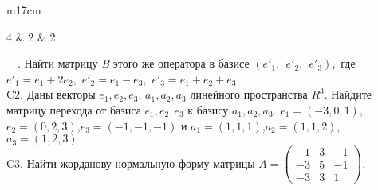 \documentclass{article}
\begin{document}
\begin{tabular}{m{17cm}}
\begin{bmatrix}
4 & 2 & 2
\end{bmatrix}\ \ .\) Найти матрицу \emph{B} этого же оператора в базисе \(({e'}_{1},\ \ {e'}_{2},\ \ {e'}_{3}),\) где \({e'}_{1} = e_{1} + 2e_{2},\) \({e'}_{2} = e_{1} - e_{3},\) \({e'}_{3} = e_{1} + e_{2} + e_{3}.\) \\
C2. Даны векторы \(e_{1},e_{2},e_{3}\), \(a_{1},a_{2},a_{3}\) линейного пространства \(R^{3}\). Найдите матрицу перехода от базиса \(e_{1},e_{2},e_{3}\) к базису \(a_{1},a_{2},a_{3}\).
\(e_{1} = ( - 3,0,1)\),\(e_{2} = (0,2,3)\),\(e_{3} = ( - 1, - 1, - 1)\) и \(a_{1} = (1,1,1)\),\(a_{2} = (1,1,2)\),\(a_{3} = (1,2,3)\) \\
C3. Найти жорданову нормальную форму матрицы \(A = \begin{pmatrix}
 - 1 & 3 & - 1 \\
 - 3 & 5 & - 1 \\
 - 3 & 3 & 1
\end{pmatrix}\). \\

\end{tabular}
\vspace{1cm}
\end{document}
